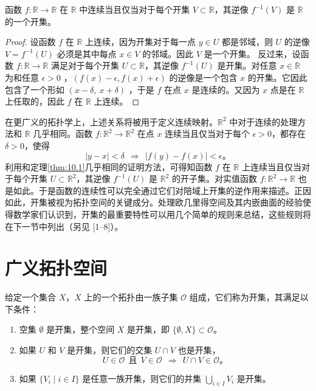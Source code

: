 \begin{theorem}\label{thm:10.1} 
     函数 $f:\mathbb{R}\rightarrow \mathbb{R}$ 在 $\mathbb{R}$ 中连续当且仅当对于每个开集 $V\subset \mathbb{R}$，其逆像 $f^{-1} (V)$ 是 $\mathbb{R}$ 的一个开集。
\end{theorem}
\begin{proof}
设函数 $ f$ 在 $ \mathbb{R}$ 上连续，因为开集对于每一点 $ y\in U$ 都是邻域，则 $ U$ 的逆像 $ V=f^{-1}( U)$ 必须是其中每点 $ x\in V$ 的邻域。因此 $ V$ 是一个开集。
    反过来，设函数 $f:\mathbb{R}\rightarrow \mathbb{R}$ 满足对于每个开集 $U\subset \mathbb{R}$，其逆像 $f^{-1} (U)$ 是开集。对任意 $x\in \mathbb{R}$ 为和任意 $\epsilon  >0$ ，$(f(x)-\epsilon ,f(x)+\epsilon )$ 的逆像是一个包含 $ x$ 的开集。它因此包含了一个形如 $ ( x-\delta ,\ x+\delta )$ ，于是 $ f$ 在点 $ x$ 是连续的。又因为 $ x$ 点是在 $\mathbb{R}$ 上任取的，因此 $ f$ 在 $\mathbb{R}$ 上连续。
\end{proof}
    在更广义的拓扑学上，上述关系将被用于定义连续映射。$\mathbb{R}^{2}$ 中对于连续的处理方法和 $ \mathbb{R}$ 几乎相同。函数 $f:\mathbb{R}^{2}\rightarrow \mathbb{R}^{2}$ 在点 $x$ 连续当且仅当对于每个 $\epsilon  >0$，都存在 $\delta  >0$，使得
\begin{equation*}
|y-x|< \delta \ \ \Rightarrow \ \ |f(y)-f(x)|< \epsilon 。
\end{equation*}
利用和定理\ref{thm:10.1}几乎相同的证明方法，可得知函数 $f$ 在 $ \mathbb{R}$ 上连续当且仅当对于每个开集 $U\subset \mathbb{R}^{2}$，其逆像 $f^{-1} (U)$ 是 $\mathbb{R}^{2}$ 的开子集。对实值函数 $f:\mathbb{R}^{2}\rightarrow \mathbb{R}$ 也是如此。于是函数的连续性可以完全通过它们对陪域上开集的逆作用来描述。正因如此，开集被视为拓扑空间的关键成分。处理欧几里得空间及其内嵌曲面的经验使得数学家们认识到，开集的最重要特性可以用几个简单的规则来总结，这些规则将在下一节中列出（另见 [1–8]）。

\section{广义拓扑空间}

给定一个集合 $X$，$X$ 上的一个拓扑由一族子集 $\mathcal{O}$ 组成，它们称为开集，其满足以下条件：

\begin{enumerate}[label=(Top\arabic*),ref=Top\arabic*]
	\item \label{top:1}
	空集 $\emptyset $ 是开集，整个空间 $X$ 是开集，即 $\{\emptyset ,X\}\subset \mathcal{O}$。
	\item \label{top:2}
	如果 $U$ 和 $V$ 是开集，则它们的交集 $U\cap V$ 也是开集，
\begin{equation*}
U\in \mathcal{O} \ \ \text{且} \ \ V\in \mathcal{O} \ \ \Rightarrow \ \ U\cap V\in \mathcal{O} 。
\end{equation*}
	\item \label{top:3}
	如果 $\{V_{i} \mid i\in I\}$ 是任意一族开集，则它们的并集 $\bigcup _{i\in I} V_{i}$ 是开集。
\end{enumerate}

